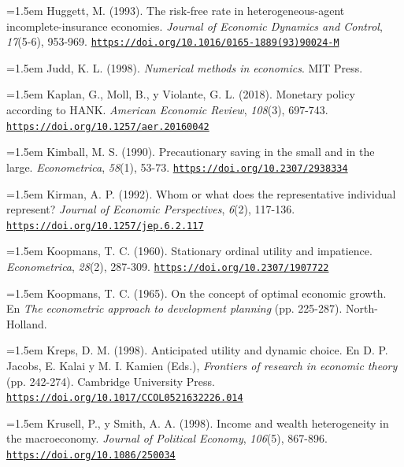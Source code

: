 \documentclass[10pt,a4paper]{article}
\begin{document}
\noindent\hangindent=1.5em Huggett, M. (1993). The risk-free rate in heterogeneous-agent incomplete-insurance economies. \textit{Journal of Economic Dynamics and Control}, \textit{17}(5-6), 953-969. \href{https://doi.org/10.1016/0165-1889(93)90024-M}{\nolinkurl{https://doi.org/10.1016/0165-1889(93)90024-M}}

\noindent\hangindent=1.5em Judd, K. L. (1998). \textit{Numerical methods in economics}. MIT Press.

\noindent\hangindent=1.5em Kaplan, G., Moll, B., y Violante, G. L. (2018). Monetary policy according to HANK. \textit{American Economic Review}, \textit{108}(3), 697-743. \href{https://doi.org/10.1257/aer.20160042}{\nolinkurl{https://doi.org/10.1257/aer.20160042}}

\noindent\hangindent=1.5em Kimball, M. S. (1990). Precautionary saving in the small and in the large. \textit{Econometrica}, \textit{58}(1), 53-73. \href{https://doi.org/10.2307/2938334}{\nolinkurl{https://doi.org/10.2307/2938334}}

\noindent\hangindent=1.5em Kirman, A. P. (1992). Whom or what does the representative individual represent? \textit{Journal of Economic Perspectives}, \textit{6}(2), 117-136. \href{https://doi.org/10.1257/jep.6.2.117}{\nolinkurl{https://doi.org/10.1257/jep.6.2.117}}

\noindent\hangindent=1.5em Koopmans, T. C. (1960). Stationary ordinal utility and impatience. \textit{Econometrica}, \textit{28}(2), 287-309. \href{https://doi.org/10.2307/1907722}{\nolinkurl{https://doi.org/10.2307/1907722}}

\noindent\hangindent=1.5em Koopmans, T. C. (1965). On the concept of optimal economic growth. En \textit{The econometric approach to development planning} (pp. 225-287). North-Holland.

\noindent\hangindent=1.5em Kreps, D. M. (1998). Anticipated utility and dynamic choice. En D. P. Jacobs, E. Kalai y M. I. Kamien (Eds.), \textit{Frontiers of research in economic theory} (pp. 242-274). Cambridge University Press. \href{https://doi.org/10.1017/CCOL0521632226.014}{\nolinkurl{https://doi.org/10.1017/CCOL0521632226.014}}

\noindent\hangindent=1.5em Krusell, P., y Smith, A. A. (1998). Income and wealth heterogeneity in the macroeconomy. \textit{Journal of Political Economy}, \textit{106}(5), 867-896. \href{https://doi.org/10.1086/250034}{\nolinkurl{https://doi.org/10.1086/250034}}
\end{document}
